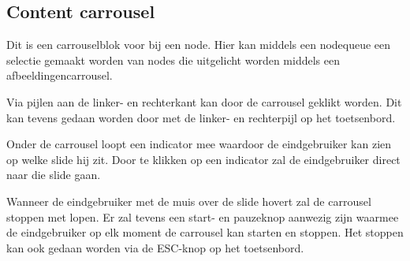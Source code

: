 \subsection{Content carrousel}
\label{sec:contentcarrousel}
Dit is een carrouselblok voor bij een node. Hier kan middels een nodequeue een selectie gemaakt worden van nodes die uitgelicht worden middels een afbeeldingencarrousel. 

Via pijlen aan de linker- en rechterkant kan door de carrousel geklikt worden. Dit kan tevens gedaan worden door met de linker- en rechterpijl op het toetsenbord.

Onder de carrousel loopt een indicator mee waardoor de eindgebruiker kan zien op welke slide hij zit. Door te klikken op een indicator zal de eindgebruiker direct naar die slide gaan. 

Wanneer de eindgebruiker met de muis over de slide hovert zal de carrousel stoppen met lopen. Er zal tevens een start- en pauzeknop aanwezig zijn waarmee de eindgebruiker op elk moment de carrousel kan starten en stoppen. Het stoppen kan ook gedaan worden via de ESC-knop op het toetsenbord.